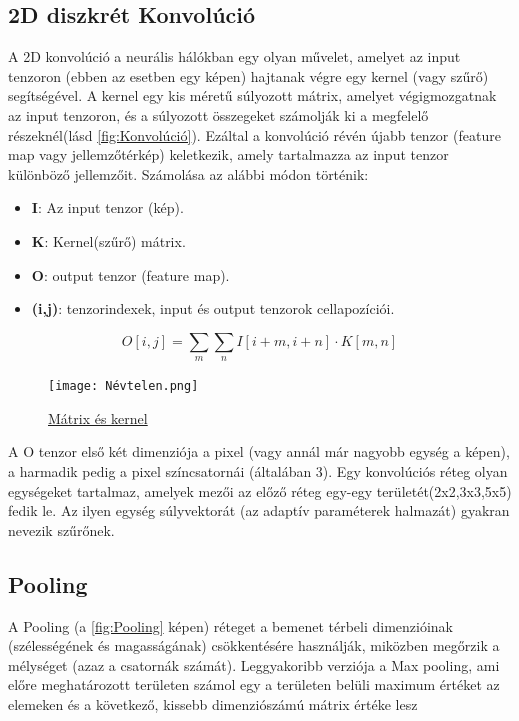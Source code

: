 \documentclass{article}
\begin{document}
\subsection{2D diszkrét Konvolúció}

A 2D konvolúció a neurális hálókban egy olyan művelet, amelyet az input tenzoron (ebben az esetben egy képen) hajtanak végre egy kernel (vagy szűrő) segítségével. A kernel egy kis méretű súlyozott mátrix, amelyet végigmozgatnak az input tenzoron, és a súlyozott összegeket számolják ki a megfelelő részeknél(lásd \autoref{fig:Konvolúció}). Ezáltal a konvolúció révén újabb tenzor (feature map vagy jellemzőtérkép) keletkezik, amely tartalmazza az input tenzor különböző jellemzőit.
Számolása az alábbi módon történik:

\begin{itemize}
\item \textbf{I}: Az input tenzor (kép).
\item \textbf{K}: Kernel(szűrő) mátrix.
\item \textbf{O}: output tenzor (feature map).
\item \textbf{(i,j)}: tenzorindexek, input és output tenzorok cellapozíciói.
\end{itemize}
\vspace{3mm}\par
\noindent\[
O[i,j] = \sum_{m} \sum_{n} I[i+m, i+n] \cdot K[m, n]
\]
\par
\begin{figure}[ht]
\centering
\texttt{[image: Névtelen.png]}
\caption{\label{fig:Konvolúció} \href{https://towardsdatascience.com/intuitively-understanding-convolutions-for-deep-learning-1f6f42faee1}{Mátrix és kernel}}
\end{figure}
\vspace{3mm}
\noindent A O tenzor első két dimenziója a pixel (vagy annál már nagyobb egység a képen), a harmadik pedig a pixel színcsatornái (általában 3). Egy konvolúciós réteg olyan egységeket tartalmaz, amelyek mezői az előző réteg egy-egy területét(2x2,3x3,5x5) fedik le. Az ilyen egység súlyvektorát (az adaptív paraméterek halmazát) gyakran nevezik szűrőnek.

\subsection{Pooling}
A Pooling  (a \autoref{fig:Pooling} képen) réteget a bemenet térbeli dimenzióinak (szélességének és magasságának) csökkentésére használják,
miközben megőrzik a mélységet (azaz a csatornák számát). \newline
Leggyakoribb verziója a Max pooling, ami előre meghatározott területen számol egy a területen belüli maximum értéket az elemeken és a következő, kissebb dimenziószámú mátrix értéke lesz
\end{document}
